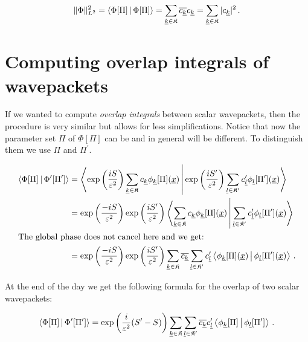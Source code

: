 \begin{equation}
  \|\Phi\|^2_{L^2} = \Braket{\Phi[\Pi] | \Phi[\Pi]} = \sum_{\underline{k}\in\mathfrak{K}} \overline{c_{\underline{k}}} c_{\underline{k}}
                   = \sum_{\underline{k}\in\mathfrak{K}} |c_{\underline{k}}|^2 \,.
\end{equation}


\section{Computing overlap integrals of wavepackets}


If we wanted to compute \emph{overlap integrals} between scalar wavepackets, then
the procedure is very similar but allows for less simplifications. Notice that
now the parameter set $\Pi$ of $\Phi[\Pi]$ can be and in general will be different.
To distinguish them we use $\Pi$ and $\Pi^\prime$.

\begin{align*}
  \Braket{\Phi[\Pi] | \Phi^\prime[\Pi^\prime]}
  & = \Braket{ \exp\left(\frac{i S}{\varepsilon^2}\right)
               \sum_{\underline{k}\in\mathfrak{K}} c_{\underline{k}} \phi_{\underline{k}}[\Pi](\underline{x})
               |
               \exp\left(\frac{i S^\prime}{\varepsilon^2}\right)
               \sum_{\underline{l}\in\mathfrak{K^\prime}} c^\prime_{\underline{l}} \phi_{\underline{l}}[\Pi^\prime](\underline{x})
              } \\
  & = \exp\left(\frac{-i S}{\varepsilon^2}\right)\exp\left(\frac{i S^\prime}{\varepsilon^2}\right)
      \Braket{ \sum_{\underline{k}\in\mathfrak{K}} c_{\underline{k}} \phi_{\underline{k}}[\Pi](\underline{x})
               |
               \sum_{\underline{l}\in\mathfrak{K^\prime}} c^\prime_{\underline{l}} \phi_{\underline{l}}[\Pi^\prime](\underline{x})
             } \\
\intertext{The global phase does not cancel here and we get:}
  & = \exp\left(\frac{-i S}{\varepsilon^2}\right)\exp\left(\frac{i S^\prime}{\varepsilon^2}\right)
      \sum_{\underline{k}\in\mathfrak{K}} \overline{c_{\underline{k}}} \sum_{\underline{l}\in\mathfrak{K^\prime}} c^\prime_{\underline{l}}
      \Braket{ \phi_{\underline{k}}[\Pi](\underline{x}) | \phi_{\underline{l}}[\Pi^\prime](\underline{x}) } \,.
\end{align*}

At the end of the day we get the following formula for the overlap of two scalar wavepackets:

\begin{equation}
  \Braket{\Phi[\Pi] | \Phi^\prime[\Pi^\prime]}
  =
  \exp\left(\frac{i}{\varepsilon^2}(S^\prime - S)\right)
  \sum_{\underline{k}\in\mathfrak{K}} \sum_{\underline{l}\in\mathfrak{K^\prime}} \overline{c_{\underline{k}}} c^\prime_{\underline{l}}
  \Braket{ \phi_{\underline{k}}[\Pi] | \phi_{\underline{l}}[\Pi^\prime] } \,.
\end{equation}

